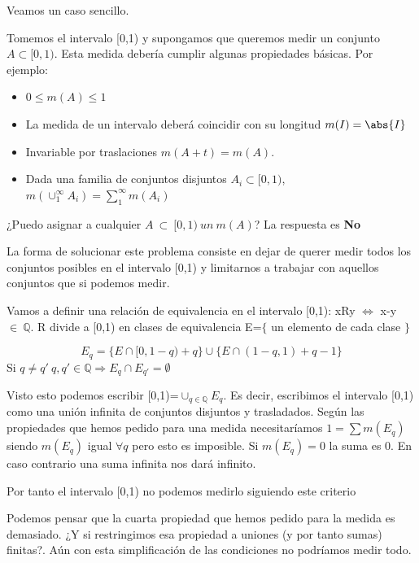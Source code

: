 \documentclass{apuntes}
\begin{document}
Veamos un caso sencillo.
\begin{example}
Tomemos el intervalo [0,1) y supongamos que queremos medir un conjunto $A\subset [0,1)$. Esta medida debería cumplir algunas propiedades básicas. Por ejemplo:
\begin{itemize}
\item $0\leq m(A) \leq 1$
\item La medida de un intervalo deberá coincidir con su longitud $m(I)=\abs{I}$
\item Invariable por traslaciones $m(A+t) = m(A)$.
\item Dada una familia de conjuntos disjuntos $A_i\subset [0,1)$, $m(\cup_{1}^{\infty} A_i) = \sum_{1}^{\infty}m(A_i)$
\end{itemize}

¿Puedo asignar a cualquier $A~\subset~[0,1)~un~m(A)$? La respuesta es \textbf{No}

La forma de solucionar este problema consiste en dejar de querer medir todos los conjuntos posibles en el intervalo [0,1) y limitarnos a trabajar con aquellos conjuntos que si podemos medir.

Vamos a definir una relación de equivalencia en el intervalo [0,1): xRy $\Leftrightarrow$ x-y~$\in~\mathbb{Q}$. R divide a [0,1) en clases de equivalencia E=$\lbrace$ un elemento de cada clase $\rbrace$

\[E_q = \lbrace E\cap [0, 1-q) +q \rbrace \cup \lbrace E\cap (1-q, 1) + q - 1\rbrace\]
Si $q \neq q' \ q,q'\in \mathbb{Q} \Rightarrow E_q\cap E_{q'} = \emptyset$

Visto esto podemos escribir [0,1)=$\cup_{q\in \mathbb{Q}}E_q$. Es decir, escribimos el intervalo [0,1) como una unión infinita de conjuntos disjuntos y trasladados. Según las propiedades que hemos pedido para una medida necesitaríamos $1 = \sum m(E_q)$ siendo $m(E_q)$ igual $\forall q$  pero esto es imposible. Si $m(E_q) = 0$ la suma es 0. En caso contrario una suma infinita nos dará infinito.

Por tanto el intervalo [0,1) no podemos medirlo siguiendo este criterio

\end{example}

Podemos pensar que la cuarta propiedad que hemos pedido para la medida es demasiado. ¿Y si restringimos esa propiedad a uniones (y por tanto sumas) finitas?. Aún con esta simplificación de las condiciones no podríamos medir todo.
\end{document}
